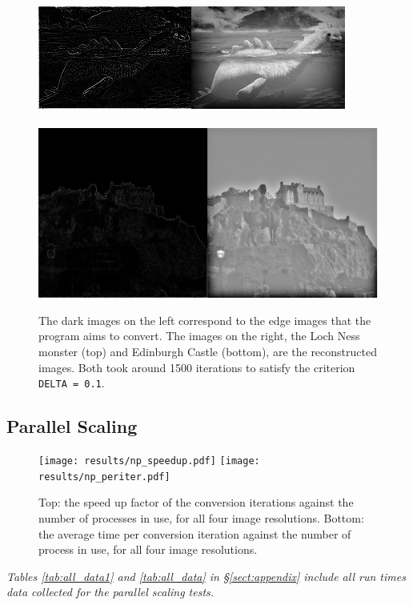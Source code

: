 \documentclass[11pt, a4paper]{article}
\begin{document}
			\begin{figure}
				\centering
				\includegraphics[scale=1.2]{image1.png}
				~\\~\\
				\includegraphics[scale=0.3]{image4.png}
				\caption{The dark images on the left correspond to the edge images that the program aims to convert. The images on the right, the Loch Ness monster (top) and Edinburgh Castle (bottom), are the reconstructed images. Both took around 1500 iterations to satisfy the criterion \texttt{DELTA = 0.1}.}
				\label{fig:before_after_images}
			\end{figure}

		\subsection{Parallel Scaling}	
			\begin{figure}
				\centering
				\texttt{[image: results/np\_speedup.pdf]}
				\texttt{[image: results/np\_periter.pdf]}
				\caption{Top: the speed up factor of the conversion iterations against the number of processes in use, for all four image resolutions. Bottom: the average time per conversion iteration against the number of process in use, for all four image resolutions.}
				\label{fig:np_runtime}
			\end{figure}
		
		\textit{Tables \ref{tab:all_data1} and \ref{tab:all_data} in \S\ref{sect:appendix} include all run times data collected for the parallel scaling tests.}
		
\end{document}
